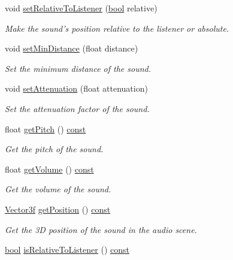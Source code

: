 \begin{DoxyCompactItemize}
void \hyperlink{classsf_1_1_sound_source_ac478a8b813faf7dd575635b102081d0d}{set\-Relative\-To\-Listener} (\hyperlink{term__entry_8h_a002004ba5d663f149f6c38064926abac}{bool} relative)
\begin{DoxyCompactList}\small\item\em Make the sound's position relative to the listener or absolute. \end{DoxyCompactList}\item 
void \hyperlink{classsf_1_1_sound_source_a75bbc2c34addc8b25a14edb908508afe}{set\-Min\-Distance} (float distance)
\begin{DoxyCompactList}\small\item\em Set the minimum distance of the sound. \end{DoxyCompactList}\item 
void \hyperlink{classsf_1_1_sound_source_aa2adff44cd2f8b4e3c7315d7c2a45626}{set\-Attenuation} (float attenuation)
\begin{DoxyCompactList}\small\item\em Set the attenuation factor of the sound. \end{DoxyCompactList}\item 
float \hyperlink{classsf_1_1_sound_source_aedad6aff442aeb6dcd267befd4fdbb59}{get\-Pitch} () \hyperlink{term__entry_8h_a57bd63ce7f9a353488880e3de6692d5a}{const} 
\begin{DoxyCompactList}\small\item\em Get the pitch of the sound. \end{DoxyCompactList}\item 
float \hyperlink{classsf_1_1_sound_source_aafb0558fce9cbebfc6828d932cbcce2f}{get\-Volume} () \hyperlink{term__entry_8h_a57bd63ce7f9a353488880e3de6692d5a}{const} 
\begin{DoxyCompactList}\small\item\em Get the volume of the sound. \end{DoxyCompactList}\item 
\hyperlink{namespacesf_a36e44d9e6d8f649703698ec9d24ac052}{Vector3f} \hyperlink{classsf_1_1_sound_source_a4c3bc60286f488aaf2941ab76476eebc}{get\-Position} () \hyperlink{term__entry_8h_a57bd63ce7f9a353488880e3de6692d5a}{const} 
\begin{DoxyCompactList}\small\item\em Get the 3\-D position of the sound in the audio scene. \end{DoxyCompactList}\item 
\hyperlink{term__entry_8h_a002004ba5d663f149f6c38064926abac}{bool} \hyperlink{classsf_1_1_sound_source_a5cb9107e1c47f65ab82c4885436061ef}{is\-Relative\-To\-Listener} () \hyperlink{term__entry_8h_a57bd63ce7f9a353488880e3de6692d5a}{const} 

\end{DoxyCompactItemize}
